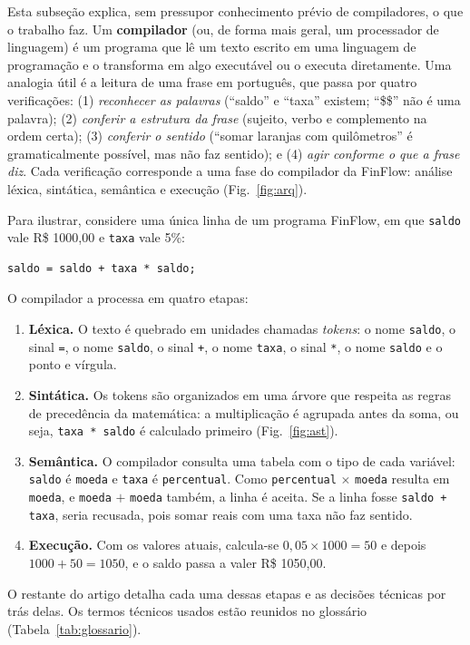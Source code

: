 \documentclass[conference]{IEEEtran}
\begin{document}
Esta subseção explica, sem pressupor conhecimento prévio de compiladores, o que o trabalho faz. Um \textbf{compilador} (ou, de forma mais geral, um processador de linguagem) é um programa que lê um texto escrito em uma linguagem de programação e o transforma em algo executável ou o executa diretamente. Uma analogia útil é a leitura de uma frase em português, que passa por quatro verificações: (1) \textit{reconhecer as palavras} (``saldo'' e ``taxa'' existem; ``\$\$'' não é uma palavra); (2) \textit{conferir a estrutura da frase} (sujeito, verbo e complemento na ordem certa); (3) \textit{conferir o sentido} (``somar laranjas com quilômetros'' é gramaticalmente possível, mas não faz sentido); e (4) \textit{agir conforme o que a frase diz}. Cada verificação corresponde a uma fase do compilador da FinFlow: análise léxica, sintática, semântica e execução (Fig.~\ref{fig:arq}).

Para ilustrar, considere uma única linha de um programa FinFlow, em que \texttt{saldo} vale R\$ 1000,00 e \texttt{taxa} vale 5\%:
\begin{minipage}{\columnwidth}\begin{lstlisting}
saldo = saldo + taxa * saldo;
\end{lstlisting}\end{minipage}\par\smallskip
O compilador a processa em quatro etapas:
\begin{enumerate}
\item \textbf{Léxica.} O texto é quebrado em unidades chamadas \textit{tokens}: o nome \texttt{saldo}, o sinal \texttt{=}, o nome \texttt{saldo}, o sinal \texttt{+}, o nome \texttt{taxa}, o sinal \texttt{*}, o nome \texttt{saldo} e o ponto e vírgula.
\item \textbf{Sintática.} Os tokens são organizados em uma árvore que respeita as regras de precedência da matemática: a multiplicação é agrupada antes da soma, ou seja, \texttt{taxa * saldo} é calculado primeiro (Fig.~\ref{fig:ast}).
\item \textbf{Semântica.} O compilador consulta uma tabela com o tipo de cada variável: \texttt{saldo} é \texttt{moeda} e \texttt{taxa} é \texttt{percentual}. Como \texttt{percentual} $\times$ \texttt{moeda} resulta em \texttt{moeda}, e \texttt{moeda} $+$ \texttt{moeda} também, a linha é aceita. Se a linha fosse \texttt{saldo + taxa}, seria recusada, pois somar reais com uma taxa não faz sentido.
\item \textbf{Execução.} Com os valores atuais, calcula-se $0{,}05 \times 1000 = 50$ e depois $1000 + 50 = 1050$, e o saldo passa a valer R\$ 1050,00.
\end{enumerate}
O restante do artigo detalha cada uma dessas etapas e as decisões técnicas por trás delas. Os termos técnicos usados estão reunidos no glossário (Tabela~\ref{tab:glossario}).
\end{document}
